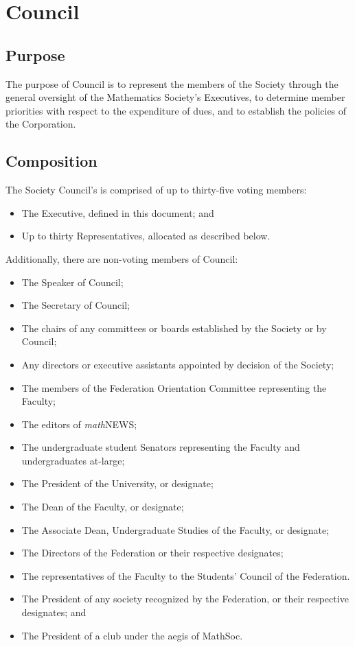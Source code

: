 \section{Council}

\subsection{Purpose}
The purpose of Council is to represent the members of the Society 
through the general oversight of the Mathematics Society’s Executives,
to determine member priorities with respect to the expenditure of dues, 
and to establish the policies of the Corporation.

\subsection{Composition}
The Society Council's is comprised of up to thirty-five voting members:
\begin{itemize}
  \item The Executive, defined in this document; and
  \item Up to thirty Representatives, allocated as described below.
\end{itemize}

\noindent Additionally, there are non-voting members of Council:
\begin{itemize}
  \item The Speaker of Council;
  \item The Secretary of Council;
  \item The chairs of any committees or boards established by the Society or by
    Council;
  \item Any directors or executive assistants appointed by decision of the
    Society;
  \item The members of the Federation Orientation Committee representing the
    Faculty;
  \item The editors of \emph{math}{\sf NEWS};
  \item The undergraduate student Senators representing the Faculty and
    undergraduates at-large;
  \item The President of the University, or designate;
  \item The Dean of the Faculty, or designate;
  \item The Associate Dean, Undergraduate Studies of the Faculty, or designate;
  \item The Directors of the Federation or their respective designates;
  \item The representatives of the Faculty to the Students' Council of the
    Federation.
  \item The President of any society recognized by the Federation, or their
    respective designates; and
  \item The President of a club under the aegis of MathSoc.
\end{itemize}

